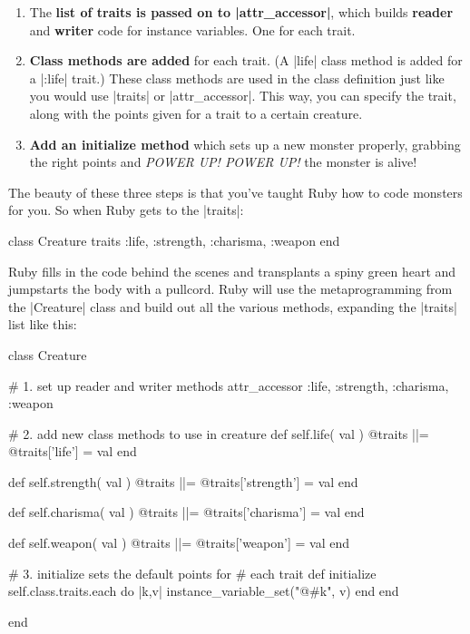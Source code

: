 \documentclass[12pt,twoside]{report}
\begin{document}
\begin{enumerate}
\item The {\bf list of traits is passed on to
  \rubyinline|attr_accessor|}, which builds {\bf
  reader} and {\bf writer} code for instance variables.  One for each
  trait.
\item {\bf Class methods are added} for each trait.  (A
  \rubyinline|life| class method is added for a
  \rubyinline|:life| trait.)  These class methods are
  used in the class definition just like you would use
  \rubyinline|traits| or
  \rubyinline|attr_accessor|.  This way, you can
  specify the trait, along with the points given for a trait to a
  certain creature.
\item {\bf Add an initialize method} which sets up a new monster
  properly, grabbing the right points and {\em POWER UP! POWER UP!}
  the monster is alive!
\end{enumerate}

The beauty of these three steps is that you've taught Ruby how to code
monsters for you.  So when Ruby gets to the
\rubyinline|traits|:


\begin{rubycode}

 class Creature
   traits :life, :strength, :charisma, :weapon
 end

\end{rubycode}


Ruby fills in the code behind the scenes and transplants a spiny green
heart and jumpstarts the body with a pullcord. Ruby will use the
metaprogramming from the \rubyinline|Creature| class
and build out all the various methods, expanding the
\rubyinline|traits| list like this:

\pagebreak

\begin{rubycode}

 class Creature

   # 1. set up reader and writer methods
   attr_accessor :life, :strength, :charisma, :weapon

   # 2. add new class methods to use in creature
   def self.life( val )
     @traits ||= {}
     @traits['life'] = val
   end

   def self.strength( val )
     @traits ||= {}
     @traits['strength'] = val
   end

   def self.charisma( val )
     @traits ||= {}
     @traits['charisma'] = val
   end

   def self.weapon( val )
     @traits ||= {}
     @traits['weapon'] = val
   end

   # 3. initialize sets the default points for
   #    each trait
   def initialize
     self.class.traits.each do |k,v|
       instance_variable_set("@#{k}", v)
     end
   end

 end

\end{rubycode}
\end{document}
